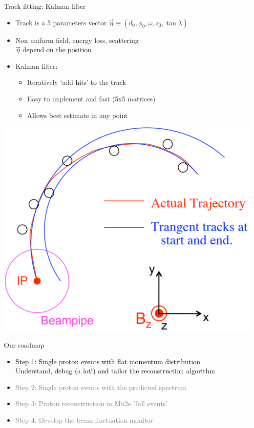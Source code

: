 \documentclass[10pt]{beamer}
\begin{document}
%
\begin{frame}{Track fitting: Kalman filter}

\noindent
\begin{minipage}{.6\textwidth}
	\begin{itemize}
	\setlength\itemsep{0.4cm}
	\item Track is a 5 parameters vector ${\vec{\eta}} \equiv ( d_0, \phi_0, \omega, z_0, \tan \lambda)$
	\item Non uniform field, energy loss, scattering \\${\vec{\eta}}$ depend on the position 
	\item Kalman filter: 
	\begin{itemize}
	\setlength\itemsep{0.2cm}
	\item Iteratively `add hits' to the track
	\item Easy to implement and fast (5x5 matrices)
	\item Allows best estimate in any point
	\end{itemize}
	\end{itemize}
\end{minipage}
\begin{minipage}{0.35\textwidth}
    \centering
	\includegraphics[width=1\textwidth]{Kutschke_Kalman_circ}
\end{minipage}
\end{frame}

\begin{frame}{Our roadmap}
\begin{itemize}
\setlength\itemsep{0.4cm}
\item \textcolor{black}{Step 1: Single proton events with flat momentum distribution\\
Understand, debug (a lot!) and tailor the reconstruction algorithm}
\item \textcolor{gray}{Step 2: Single proton events with the predicted spectrum}
\item \textcolor{gray}{Step 3: Proton reconstruction in Mu2e 'full events'}
\item \textcolor{gray}{Step 4: Develop the beam fluctuation monitor}
\end{itemize}
\end{frame}
\end{document}
